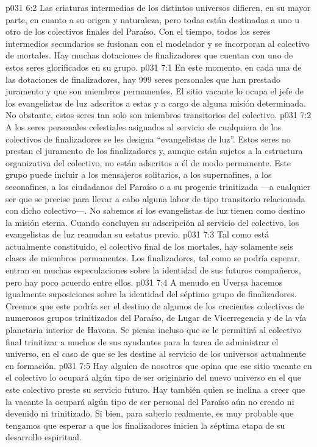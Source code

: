 \vs p031 6:2 Las criaturas intermedias de los distintos universos difieren, en su mayor parte, en cuanto a su origen y naturaleza, pero todas están destinadas a uno u otro de los colectivos finales del Paraíso. Con el tiempo, todos los seres intermedios secundarios se fusionan con el modelador y se incorporan al colectivo de mortales. Hay muchas dotaciones de finalizadores que cuentan con uno de estos seres glorificados en su grupo.
\vs p031 7:1 En este momento, en cada una de las dotaciones de finalizadores, hay 999 seres personales que han prestado juramento y que son miembros permanentes. El sitio vacante lo ocupa el jefe de los evangelistas de luz adscritos a estas y a cargo de alguna misión determinada. No obstante, estos seres tan solo son miembros transitorios del colectivo.
\vs p031 7:2 A los seres personales celestiales asignados al servicio de cualquiera de los colectivos de finalizadores se les designa “evangelistas de luz”. Estos seres no prestan el juramento de los finalizadores y, aunque están sujetos a la estructura organizativa del colectivo, no están adscritos a él de modo permanente. Este grupo puede incluir a los mensajeros solitarios, a los supernafines, a los seconafines, a los ciudadanos del Paraíso o a su progenie trinitizada ---a cualquier ser que se precise para llevar a cabo alguna labor de tipo transitorio relacionada con dicho colectivo---. No sabemos si los evangelistas de luz tienen como destino la misión eterna. Cuando concluyen su adscripción al servicio del colectivo, los evangelistas de luz reanudan su estatus previo.
\vs p031 7:3 \pc Tal como está actualmente constituido, el colectivo final de los mortales, hay solamente seis clases de miembros permanentes. Los finalizadores, tal como se podría esperar, entran en muchas especulaciones sobre la identidad de sus futuros compañeros, pero hay poco acuerdo entre ellos.
\vs p031 7:4 A menudo en Uversa hacemos igualmente suposiciones sobre la identidad del séptimo grupo de finalizadores. Creemos que este podría ser el destino de algunos de los crecientes colectivos de numerosos grupos trinitizados del Paraíso, de Lugar de Vicerregencia y de la vía planetaria interior de Havona. Se piensa incluso que se le permitirá al colectivo final trinitizar a muchos de sus ayudantes para la tarea de administrar el universo, en el caso de que se les destine al servicio de los universos actualmente en formación.
\vs p031 7:5 Hay alguien de nosotros que opina que ese sitio vacante en el colectivo lo ocupará algún tipo de ser originario del nuevo universo en el que este colectivo preste su servicio futuro. Hay también quien se inclina a creer que la vacante la ocupará algún tipo de ser personal del Paraíso aún no creado ni devenido ni trinitizado. Si bien, para saberlo realmente, es muy probable que tengamos que esperar a que los finalizadores inicien la séptima etapa de su desarrollo espiritual.
